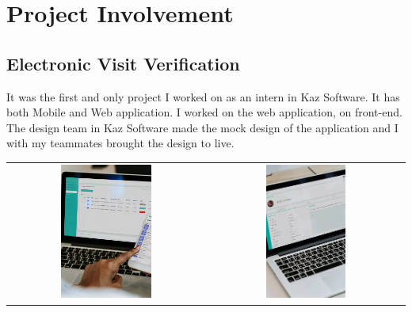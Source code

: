 \chapter{Project Involvement}

\section{Electronic Visit Verification}

It was the first and only project I worked on as an intern in Kaz Software.
It has both Mobile and Web application.
I worked on the web application, on front-end.
The design team in Kaz Software made the mock design of the application and I with my teammates brought the design to live.

\begin{center}
    \begin{tabular}{cc}
    \includegraphics[width=0.475\textwidth]{images/Chapter4/Evv/mock1.png} & \includegraphics[width=0.4224\textwidth]{images/Chapter4/Evv/mock2.png}
    \end{tabular}
\end{center}

